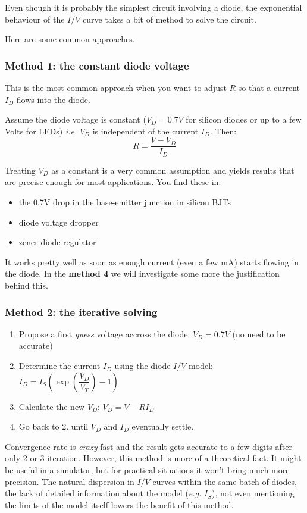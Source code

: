 \documentclass[10pt]{article}
\begin{document}
Even though it is probably the simplest circuit involving a diode, the exponential behaviour of the $I/V$ curve takes a bit of method to solve the circuit.

Here are some common approaches.

\subsubsection*{Method 1: the constant diode voltage}
This is the most common approach when you want to adjust $R$ so that a current $I_D$ flows into the diode. 

Assume the diode voltage is constant ($V_D = 0.7V$ for silicon diodes or up to a few Volts for LEDs) \textit {i.e.} $V_D$ is independent of the current $I_D$. Then:
$$
	R = \dfrac{V - V_D}{I_D}
$$

Treating $V_D$ as a constant is a very common assumption and yields results that are precise enough for most applications. You find these in:
\begin{itemize}
	\item the 0.7V drop in the base-emitter junction in silicon BJTs
	\item diode voltage dropper	
	\item zener diode regulator
\end{itemize} 

It works pretty well as soon as enough current (even a few mA) starts flowing in the diode. In the \textbf{method 4} we will investigate some more the justification behind this.

\subsubsection*{Method 2: the iterative solving}
	\begin{enumerate}
		\item Propose a first \textit{guess} voltage accross the diode: $V_D = 0.7V$ (no need to be accurate)
		\item Determine the current $I_D$ using the diode $I/V$ model: $I_D = I_S \left( \exp \left( \dfrac{V_D}{V_T}\right)-1\right)$
		\item Calculate the new $V_D$: $V_D = V - R I_D$ 
		\item Go back to 2. until $V_D$ and $I_D$ eventually settle. 
	\end{enumerate}
	Convergence rate is \textit{crazy} fast and the result gets accurate to a few digits after only 2 or 3 iteration. 
	However, this method is more of a theoretical fact. It might be useful in a simulator, but for practical situations it won't bring much more precision. The natural dispersion in $I/V$ curves within the same batch of diodes, the lack of detailed information about the model (\textit{e.g.} $I_S$), not even mentioning the limits of the model itself lowers the benefit of this method.
\end{document}
